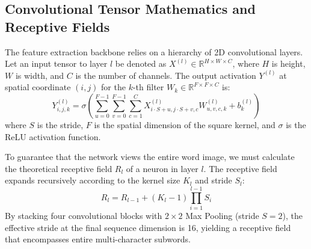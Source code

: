 \subsection{Convolutional Tensor Mathematics and Receptive Fields}
The feature extraction backbone relies on a hierarchy of 2D convolutional layers. Let an input tensor to layer $l$ be denoted as $X^{(l)} \in \mathbb{R}^{H \times W \times C}$, where $H$ is height, $W$ is width, and $C$ is the number of channels. The output activation $Y^{(l)}$ at spatial coordinate $(i, j)$ for the $k$-th filter $W_k \in \mathbb{R}^{F \times F \times C}$ is:
\begin{equation}
    Y_{i,j,k}^{(l)} = \sigma \left( \sum_{u=0}^{F-1} \sum_{v=0}^{F-1} \sum_{c=1}^{C} X_{i \cdot S + u, j \cdot S + v, c}^{(l)} W_{u,v,c,k}^{(l)} + b_k^{(l)} \right)
\end{equation}
where $S$ is the stride, $F$ is the spatial dimension of the square kernel, and $\sigma$ is the ReLU activation function.

To guarantee that the network views the entire word image, we must calculate the theoretical receptive field $R_l$ of a neuron in layer $l$. The receptive field expands recursively according to the kernel size $K_l$ and stride $S_l$:
\begin{equation}
    R_l = R_{l-1} + (K_l - 1) \prod_{i=1}^{l-1} S_i
\end{equation}
By stacking four convolutional blocks with $2\times 2$ Max Pooling (stride $S=2$), the effective stride at the final sequence dimension is 16, yielding a receptive field that encompasses entire multi-character subwords. 

